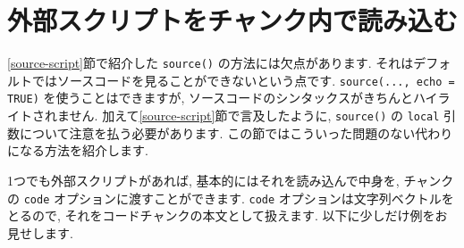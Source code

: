 \documentclass[
  11pt,
  lualatex,ja=standard,jafont=noto]{bxjsreport}
\begin{document}
\hypertarget{option-code}{%
\section{外部スクリプトをチャンク内で読み込む}\label{option-code}}

\ref{source-script}節で紹介した \texttt{source()} の方法には欠点があります. それはデフォルトではソースコードを見ることができないという点です. \texttt{source(..., echo = TRUE)} を使うことはできますが, ソースコードのシンタックスがきちんとハイライトされません. 加えて\ref{source-script}節で言及したように, \texttt{source()} の \texttt{local} 引数について注意を払う必要があります. この節ではこういった問題のない代わりになる方法を紹介します.

1つでも外部スクリプトがあれば, 基本的にはそれを読み込んで中身を, チャンクの \texttt{code} オプションに渡すことができます. \texttt{code} オプションは文字列ベクトルをとるので, それをコードチャンクの本文として扱えます. 以下に少しだけ例をお見せします.
\end{document}
